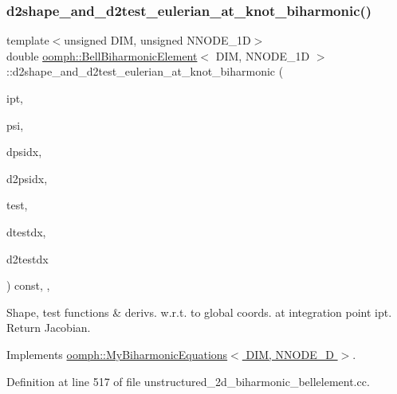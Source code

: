 \subsubsection{\texorpdfstring{d2shape\+\_\+and\+\_\+d2test\+\_\+eulerian\+\_\+at\+\_\+knot\+\_\+biharmonic()}{d2shape\_and\_d2test\_eulerian\_at\_knot\_biharmonic()}}
{\footnotesize\ttfamily template$<$unsigned D\+IM, unsigned N\+N\+O\+D\+E\+\_\+1D$>$ \\
double \hyperlink{classoomph_1_1BellBiharmonicElement}{oomph\+::\+Bell\+Biharmonic\+Element}$<$ D\+IM, N\+N\+O\+D\+E\+\_\+1D $>$\+::d2shape\+\_\+and\+\_\+d2test\+\_\+eulerian\+\_\+at\+\_\+knot\+\_\+biharmonic (\begin{DoxyParamCaption}\item[{const unsigned \&}]{ipt,  }\item[{Shape \&}]{psi,  }\item[{D\+Shape \&}]{dpsidx,  }\item[{D\+Shape \&}]{d2psidx,  }\item[{Shape \&}]{test,  }\item[{D\+Shape \&}]{dtestdx,  }\item[{D\+Shape \&}]{d2testdx }\end{DoxyParamCaption}) const\hspace{0.3cm}{\ttfamily [inline]}, {\ttfamily [protected]}, {\ttfamily [virtual]}}



Shape, test functions \& derivs. w.\+r.\+t. to global coords. at integration point ipt. Return Jacobian. 



Implements \hyperlink{classoomph_1_1MyBiharmonicEquations_a85687f39c0fb72f25ce67f5867a83470}{oomph\+::\+My\+Biharmonic\+Equations$<$ D\+I\+M, N\+N\+O\+D\+E\+\_\+D $>$}.



Definition at line 517 of file unstructured\+\_\+2d\+\_\+biharmonic\+\_\+bellelement.\+cc.

\mbox{\label{classoomph_1_1BellBiharmonicElement_af26cb1e9c4980ae4b0911238820f6ae1}} 
